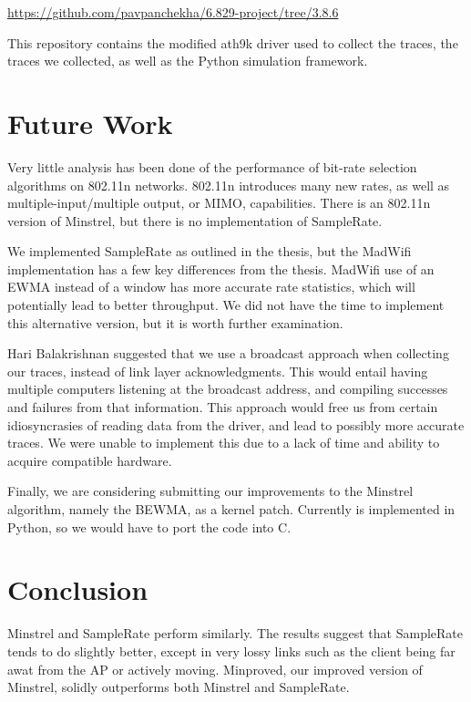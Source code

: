 \documentclass[twocolumn,10pt]{article}
\begin{document}
\noindent
{\small\url{https://github.com/pavpanchekha/6.829-project/tree/3.8.6}}

This repository contains the modified ath9k driver used to collect the
traces, the traces we collected, as well as the Python simulation
framework.

\section{Future Work}

Very little analysis has been done of the performance of bit-rate
selection algorithms on 802.11n networks.  802.11n introduces many new
rates, as well as multiple-input/multiple output, or MIMO,
capabilities.  There is an 802.11n version of Minstrel, but there is no
implementation of SampleRate.

We implemented SampleRate as outlined in the thesis, but the MadWifi
implementation has a few key differences from the thesis.  MadWifi use
of an EWMA instead of a window has more accurate rate statistics,
which will potentially lead to better throughput.  We did not have the
time to implement this alternative version, but it is worth further
examination.

Hari Balakrishnan suggested that we use a broadcast approach when
collecting our traces, instead of link layer acknowledgments.  This
would entail having multiple computers listening at the broadcast
address, and compiling successes and failures from that information.
This approach would free us from certain idiosyncrasies of reading
data from the driver, and lead to possibly more accurate traces.  We
were unable to implement this due to a lack of time and ability to
acquire compatible hardware.

Finally, we are considering submitting our improvements to the
Minstrel algorithm, namely the BEWMA, as a kernel patch.  Currently is
implemented in Python, so we would have to port the code into C.

\section{Conclusion}

Minstrel and SampleRate perform similarly.  The results suggest that
SampleRate tends to do slightly better, except in very lossy links
such as the client being far awat from the AP or actively moving.
Minproved, our improved version of Minstrel, solidly outperforms both
Minstrel and SampleRate.
\end{document}
